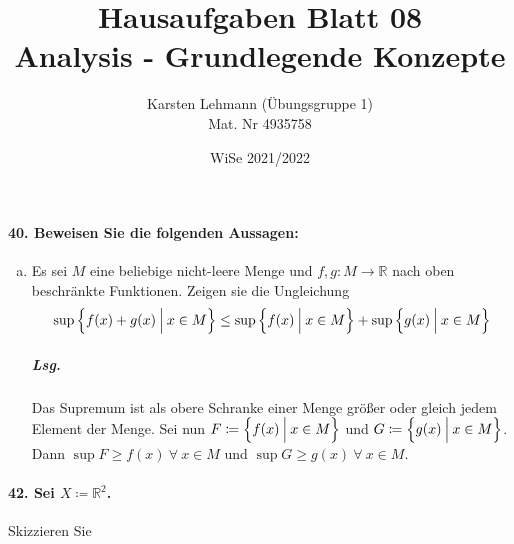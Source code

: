 \documentclass{scrreprt}
\author{Karsten Lehmann (Übungsgruppe 1)\\Mat. Nr 4935758}
\date{WiSe 2021/2022}
\title{Hausaufgaben Blatt 08\\Analysis - Grundlegende Konzepte}
\begin{document}
\paragraph{40. Beweisen Sie die folgenden Aussagen:}
\begin{enumerate}[(a)]
\item Es sei $M$ eine beliebige nicht-leere Menge und
  $f, g \colon M \to \mathbb{R}$ nach oben beschränkte Funktionen.
  Zeigen sie die Ungleichung
  \[
    \sup\qty{f(x) + g(x) \: {\Big |} \: x \in M}
    \leq
    \sup\qty{f(x) \: {\Big |} \: x \in M} +
    \sup\qty{g(x) \: {\Big |} \: x \in M}
  \]

  \subparagraph{Lsg.} Das Supremum ist als obere Schranke einer Menge größer
  oder gleich jedem Element der Menge.
  Sei nun $F \coloneqq \qty{f(x) \: {\Big |} \: x \in M}$ und
  $G \coloneqq \qty{g(x) \: {\Big |} \: x \in M}$.
  Dann $\sup F \geq f(x) \: \forall \: x \in M$ und
  $\sup G \geq g(x) \: \forall \: x \in M$.
\end{enumerate}

\paragraph{42. Sei $X \coloneqq \mathbb{R}^2$.}
Skizzieren Sie
\end{document}
